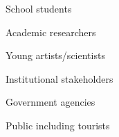 \item School students
\item Academic researchers
\item Young artists/scientists
\item Institutional  stakeholders
\item Government agencies
\item Public including tourists
